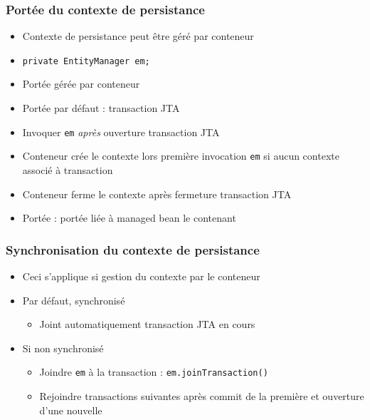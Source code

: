 \documentclass[english, french]{beamer}
\begin{document}
\begin{frame}
	\frametitle{Portée du contexte de persistance}
	\begin{itemize}
		\item Contexte de persistance peut être géré par conteneur
		\item {} \texttt{private EntityManager em;}
		\item Portée gérée par conteneur
		\item Portée par défaut : transaction JTA
		\item Invoquer \texttt{em} \emph{après} ouverture transaction JTA
		\item Conteneur crée le contexte lors première invocation \texttt{em} {\tiny si aucun contexte associé à transaction}
		\item Conteneur ferme le contexte après fermeture transaction JTA
		\item Portée  : portée liée à managed bean le contenant %
	\end{itemize}
\end{frame}

\begin{frame}
	\frametitle{Synchronisation du contexte de persistance}
	\begin{itemize}
		\item Ceci s’applique si gestion du contexte par le conteneur
		\item Par défaut, synchronisé
		\begin{itemize}
			\item Joint automatiquement transaction JTA en cours
		\end{itemize}
		\item Si non synchronisé
		\begin{itemize}
			\item Joindre \texttt{em} à la transaction : \texttt{em.joinTransaction()}
			\item Rejoindre transactions suivantes après commit de la première et ouverture d’une nouvelle
		\end{itemize}
	\end{itemize}
\end{frame}
\end{document}
